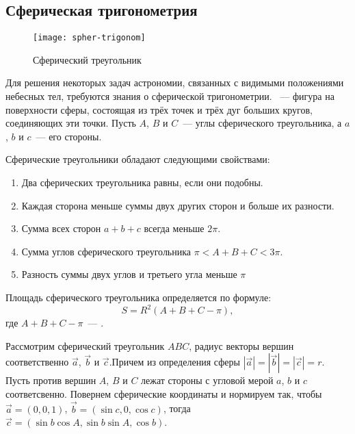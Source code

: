 \subsection{Сферическая тригонометрия}
\label{sec:spher-trig}
\begin{wrapfigure}[10]{r}{.3\tw}
    \centering
    \vspace{-1pc}
    \texttt{[image: spher-trigonom]}
    \caption{Сферический треугольник}
\end{wrapfigure}
Для решения некоторых задач астрономии, связанных с видимыми положениями небесных тел, требуются знания о сферической тригонометрии. ~--- фигура на поверхности сферы, состоящая из трёх точек и трёх дуг больших кругов, соединяющих эти точки. Пусть $A$, $B$ и $C$~--- углы сферического треугольника, а $a$, $b$ и $c$~--- его стороны.

Сферические треугольники обладают следующими свойствами:
\begin{enumerate}
    \item Два сферических треугольника равны, если они подобны.
    \item Каждая сторона меньше суммы двух других сторон и больше их разности.
    \item Сумма всех сторон $a+b+c$ всегда меньше $2\pi$.
    \item Сумма углов сферического треугольника $\pi < A + B + C < 3\pi$.
    \item Разность суммы двух углов и третьего угла меньше $\pi$
\end{enumerate}

Площадь сферического треугольника определяется по формуле:
\begin{equation}
    S = R^2( A + B + C - \pi),
\end{equation}
где $A + B + C - \pi$~--- .

Рассмотрим сферический треугольник $ABC$, радиус векторы вершин соответственно $\vec{a}$, $\vec{b}$ и $\vec{c}$.Причем из определения сферы $|\vec{a}| = |\vec{b}| = |\vec{c}| = r$. Пусть против вершин $A$, $B$ и $C$ лежат стороны с угловой мерой $a$, $b$ и $c$ соответсвенно. Повернем сферические координаты и нормируем так, чтобы $\vec{a} = (0, 0, 1)$, $\vec{b} = (\sin c, 0, \cos c)$, тогда $ \vec{c} = (\sin b \cos A, \sin b \sin A, \cos b)$.

